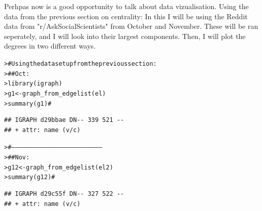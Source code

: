 \documentclass[12pt]{article}\usepackage[]{graphicx}\usepackage[]{color}
\makeatletter
\newcommand{\hlcom}[1]{\textcolor[rgb]{0.404,0.408,0.42}{#1}}%
\newcommand{\hlstd}[1]{\textcolor[rgb]{0.882,0.878,0.898}{#1}}%
\newcommand{\hlkwb}[1]{\textcolor[rgb]{0.902,0.675,0.196}{#1}}%
\newcommand{\hlkwd}[1]{\textcolor[rgb]{0.733,0.388,0.812}{#1}}%
\newenvironment{kframe}{%
 \def\at@end@of@kframe{}%
 \ifinner\ifhmode%
  \def\at@end@of@kframe{\end{minipage}}%
  \begin{minipage}{\columnwidth}%
 \fi\fi%
 \def\FrameCommand##1{\hskip\@totalleftmargin \hskip-\fboxsep
 \colorbox{shadecolor}{##1}\hskip-\fboxsep
     \hskip-\linewidth \hskip-\@totalleftmargin \hskip\columnwidth}%
 \MakeFramed {\advance\hsize-\width
   \@totalleftmargin\z@ \linewidth\hsize
   \@setminipage}}%
 {\par\unskip\endMakeFramed%
 \at@end@of@kframe}
\newenvironment{knitrout}{}{} %
\makeatother
\begin{document}
\begin{flushleft}
Perhpas now is a good opportunity to talk about data vizualisation. Using the data from the previous section on centrality:
In this I will be using the Reddit data from "r/AskSocialScientists" from October and November. These will be ran seperately, and I will look into their largest components. Then, I will plot the degrees in two different ways.

\begin{knitrout}
\color{fgcolor}\begin{kframe}
\begin{alltt}
\hlstd{> }\hlcom{# Using the data set up from the previous section:}
\hlstd{> }\hlcom{##    Oct:}
\hlstd{> }\hlkwd{library}\hlstd{(igraph)}
\hlstd{> }\hlstd{g1} \hlkwb{<-} \hlkwd{graph_from_edgelist}\hlstd{(el)}
\hlstd{> }\hlkwd{summary}\hlstd{(g1)} \hlcom{#}
\end{alltt}
\begin{verbatim}
## IGRAPH d29bbae DN-- 339 521 -- 
## + attr: name (v/c)
\end{verbatim}
\begin{alltt}
\hlstd{> }\hlcom{#---------------------------------------------------------------------------}
\hlstd{> }\hlcom{##   Nov:}
\hlstd{> }\hlstd{g12} \hlkwb{<-} \hlkwd{graph_from_edgelist}\hlstd{(el2)}
\hlstd{> }\hlkwd{summary}\hlstd{(g12)} \hlcom{#}
\end{alltt}
\begin{verbatim}
## IGRAPH d29c55f DN-- 327 522 -- 
## + attr: name (v/c)
\end{verbatim}
\end{kframe}
\end{knitrout}


\end{flushleft}
\end{document}
